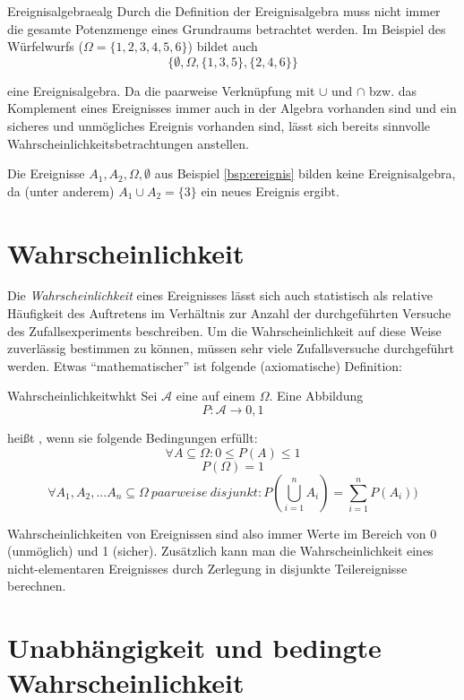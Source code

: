 \begin{example}{Ereignisalgebra}{ealg}
Durch die Definition der Ereignisalgebra muss nicht immer die gesamte Potenzmenge
eines Grundraums betrachtet werden. Im Beispiel des Würfelwurfs ($\Omega =
\{1,2,3,4,5,6\}$) bildet auch
\[\{\emptyset, \Omega, \{1,3,5\}, \{2,4,6\}\}\]

eine Ereignisalgebra. Da die paarweise Verknüpfung mit $\cup$ und $\cap$ bzw. das
Komplement eines Ereignisses immer auch in der Algebra vorhanden sind und ein
sicheres und unmögliches Ereignis vorhanden sind, lässt sich bereits sinnvolle
Wahrscheinlichkeitsbetrachtungen anstellen.

Die Ereignisse $A_1, A_2, \Omega, \emptyset$ aus Beispiel \ref{bsp:ereignis}
bilden keine Ereignisalgebra, da (unter anderem) $A_1 \cup A_2 = \{3\}$ ein
neues Ereignis ergibt.
\end{example}


\section{Wahrscheinlichkeit}

Die \emph{Wahrscheinlichkeit} eines Ereignisses lässt sich auch statistisch als
relative Häufigkeit des Auftretens im Verhältnis zur Anzahl der durchgeführten
Versuche des Zufallsexperiments beschreiben. Um die Wahrscheinlichkeit auf diese
Weise zuverlässig bestimmen zu können, müssen sehr viele Zufallsversuche
durchgeführt werden. Etwas "`mathematischer"' ist folgende (axiomatische)
Definition:

\begin{definition}{Wahrscheinlichkeit}{whkt}
Sei $\mathcal{A}$ eine  auf einem
 $\Omega$. Eine Abbildung
\[ P: \mathcal{A} \to 0,1 \]

heißt , wenn sie folgende Bedingungen erfüllt:
\[\forall A \subseteq \Omega: 0 \leq P(A) \leq 1\]
\[P(\Omega) = 1\]
\[\forall A_1, A_2, ... A_n \subseteq \Omega\ paarweise\ disjunkt:
P(\bigcup_{i=1}^{n} A_i) = \sum_{i=1}^{n}P(A_i))\]
\end{definition}

Wahrscheinlichkeiten von Ereignissen sind also immer Werte im Bereich von 0
(unmöglich) und 1 (sicher). Zusätzlich kann man die Wahrscheinlichkeit eines
nicht-elementaren Ereignisses durch Zerlegung in disjunkte Teilereignisse
berechnen.


\section{Unabhängigkeit und bedingte Wahrscheinlichkeit}

